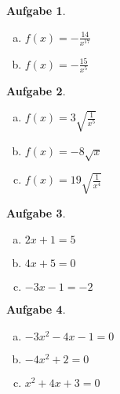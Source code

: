 \documentclass[12pt]{article}
\theoremstyle{note}
\newtheorem{aufgabe}{Aufgabe}
\begin{document}
\begin{flushleft}
\begin{aufgabe}
\begin{multicols}{3}
\begin{enumerate}[a)]
\item $f(x)=$$- \frac{14}{x^{17}}$\\

\item $f(x)=$$- \frac{15}{x^{5}}$\\

\end{enumerate} 
\end{multicols} 
\end{aufgabe}\vspace{1em}\begin{aufgabe} ~ \ 
\begin{multicols}{3} 
\begin{enumerate}[a)] 
\item $f(x)=$$3 \sqrt{\frac{1}{x^{5}}}$\\

\item $f(x)=$$- 8 \sqrt{x}$\\

\item $f(x)=$$19 \sqrt{\frac{1}{x^{4}}}$\\

\end{enumerate} 
\end{multicols} 
\end{aufgabe}\vspace{1em}\begin{aufgabe} ~ \ 
\begin{multicols}{3} 
\begin{enumerate}[a)] 
\item $2 x + 1 = 5$\\

\item $4 x + 5 = 0$\\

\item $- 3 x - 1 = -2$\\

\end{enumerate} 
\end{multicols} 
\end{aufgabe}\vspace{1em}\begin{aufgabe} ~ \ 
\begin{multicols}{3} 
\begin{enumerate}[a)] 
\item $- 3 x^{2} - 4 x - 1 = 0$\\
\item $- 4 x^{2} + 2 = 0$\\
\item $x^{2} + 4 x + 3 = 0$\\
\end{enumerate} 
\end{multicols} 
\end{aufgabe}\vspace{1em}
\end{flushleft} 
\end{document}
